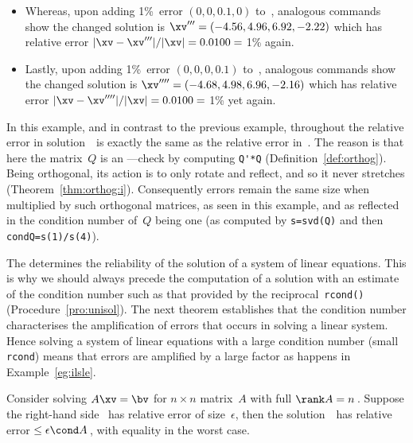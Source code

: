 \begin{example}
\begin{solution}
\begin{itemize}
\item Whereas, upon adding 1\%~error \((0,0,0.1,0)\) to~\bv, analogous commands show the changed solution is \(\xv'''=(-4.56,4.96,6.92,-2.22)\) which has relative error \(|\xv-\xv'''|/|\xv|=0.0100={}\)1\% again.

\item Lastly, upon adding 1\%~error \((0,0,0,0.1)\) to~\bv, analogous commands show the changed solution is \(\xv''''=(-4.68,4.98,6.96,-2.16)\) which has relative error \(|\xv-\xv''''|/|\xv|=0.0100={}\)1\% yet again.

\end{itemize}
In this example, and in contrast to the previous example, throughout the relative error in solution~\xv\ is exactly the same as the relative error in~\bv.
The reason is that here the matrix~\(Q\) is an ---check by computing \verb|Q'*Q| (Definition~\ref{def:orthog}).
Being orthogonal, its action is to only rotate and reflect, and so it never stretches (Theorem~\ref{thm:orthog:i}).
Consequently errors remain the same size when multiplied by such orthogonal matrices, as seen in this example, and as reflected in the condition number of~\(Q\) being one (as computed by \verb|s=svd(Q)| and then \verb|condQ=s(1)/s(4)|).
\end{solution}
\end{example}





The  determines the reliability of the solution of a system of linear equations.
This is why we should always precede the computation of a solution with an estimate of the condition number such as that provided by the reciprocal~\verb|rcond()| (Procedure~\ref{pro:unisol}). 
The next theorem establishes that the condition number characterises the amplification of errors that occurs in solving a linear system.
Hence solving a system of linear equations with a large condition number (small \verb|rcond|) means that errors are amplified by a large factor as happens in Example~\ref{eg:ilsle}.

\begin{theorem} \label{thm:erramp}
Consider solving \(A\xv=\bv\) for \(n\times n\) matrix~\(A\) with full \(\rank A=n\)\,.  
Suppose the right-hand side \bv~has relative error of size~\(\epsilon\), then the solution~\xv\ has relative error\({}\leq\epsilon\cond A\)\,, with equality in the worst case.
\end{theorem}


